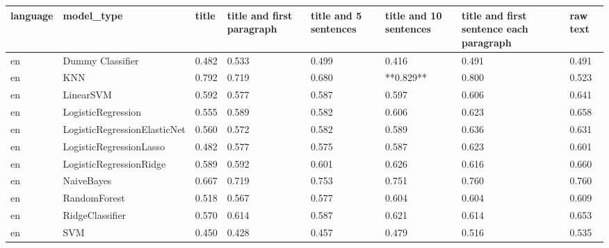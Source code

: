\begin{tabular}{llllllll}
\toprule
language &                   model\_type & title & title and first paragraph & title and 5 sentences & title and 10 sentences & title and first sentence each paragraph &  raw text \\
\midrule
      en &             Dummy Classifier & 0.482 &                     0.533 &                 0.499 &                  0.416 &                                   0.491 &     0.491 \\
      en &                          KNN & 0.792 &                     0.719 &                 0.680 &              **0.829** &                                   0.800 &     0.523 \\
      en &                    LinearSVM & 0.592 &                     0.577 &                 0.587 &                  0.597 &                                   0.606 &     0.641 \\
      en &           LogisticRegression & 0.555 &                     0.589 &                 0.582 &                  0.606 &                                   0.623 &     0.658 \\
      en & LogisticRegressionElasticNet & 0.560 &                     0.572 &                 0.582 &                  0.589 &                                   0.636 &     0.631 \\
      en &      LogisticRegressionLasso & 0.482 &                     0.577 &                 0.575 &                  0.587 &                                   0.623 &     0.601 \\
      en &      LogisticRegressionRidge & 0.589 &                     0.592 &                 0.601 &                  0.626 &                                   0.616 &     0.660 \\
      en &                   NaiveBayes & 0.667 &                     0.719 &                 0.753 &                  0.751 &                                   0.760 &     0.760 \\
      en &                 RandomForest & 0.518 &                     0.567 &                 0.577 &                  0.604 &                                   0.604 &     0.609 \\
      en &              RidgeClassifier & 0.570 &                     0.614 &                 0.587 &                  0.621 &                                   0.614 &     0.653 \\
      en &                          SVM & 0.450 &                     0.428 &                 0.457 &                  0.479 &                                   0.516 &     0.535 \\

\end{tabular}
